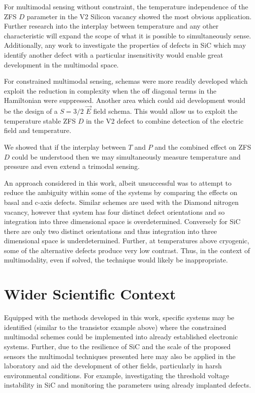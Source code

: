 For multimodal sensing without constraint, the temperature independence of the ZFS $D$ parameter in the V2 Silicon vacancy showed the most obvious application. Further research into the interplay between temperature and any other characteristic will expand the scope of what it is possible to simultaneously sense. Additionally, any work to investigate the properties of defects in SiC which may identify another defect with a particular insensitivity would enable great development in the multimodal space. 


For constrained multimodal sensing, schemas were more readily developed which exploit the reduction in complexity when the off diagonal terms in the Hamiltonian were suppressed. 
Another area which could aid development would be the design of a $S= 3/2$ $\vec{E}$ field schema. This would allow us to exploit the temperature stable ZFS $D$ in the V2 defect to combine detection of the electric field and temperature.

We showed that if the interplay between $T$ and $P$ and the combined effect on ZFS $D$ could be understood then we may simultaneously measure temperature and pressure and even extend a trimodal sensing. 

An approach considered in this work, albeit unsuccessful was to attempt to reduce the ambiguity within some of the systems by comparing the effects on basal and c-axis defects. Similar schemes are used with the Diamond nitrogen vacancy, however that system has four distinct defect orientations and so integration into three dimensional space is overdetermined. Conversely for SiC there are only two distinct orientations and thus integration into three dimensional space is underdetermined. Further, at temperatures above cryogenic, some of the alternative defects produce very low contrast. Thus, in the context of multimodality, even if solved, the technique would likely be inappropriate. 

\section{Wider Scientific Context}
Equipped with the methods developed in this work, specific systems may be identified (similar to the transistor example above) where the constrained multimodal schemes could be implemented into already established electronic systems. Further, due to the resilience of SiC and the scale of the proposed sensors the multimodal techniques presented here may also be applied in the laboratory and aid the development of other fields, particularly in harsh environmental conditions. For example, investigating the threshold voltage instability in SiC and monitoring the parameters using already implanted defects. 

